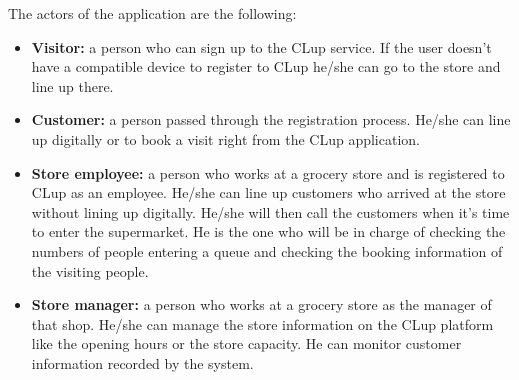 The actors of the application are the following:
\begin{itemize}
    \item \textbf{Visitor:} a person who can sign up to the CLup service. If the user doesn't have a compatible device to register to CLup he/she can go to the store and line up there.
    \item \textbf{Customer:} a person passed through the registration process. He/she can line up digitally or to book a visit right from the CLup application.
    \item \textbf{Store employee:} a person who works at a grocery store and is registered to CLup as an employee. He/she can line up customers who arrived at the store without lining up digitally. He/she will then call the customers when it's time to enter the supermarket. He is the one who will be in charge of checking the numbers of people entering a queue and checking the booking information of the visiting people.
    \item \textbf{Store manager:} a person who works at a grocery store as the manager of that shop. He/she can manage the store information on the CLup platform like the opening hours or the store capacity. He can monitor customer information recorded by the system.
\end{itemize}